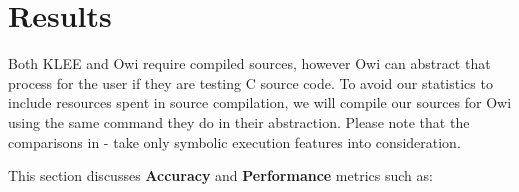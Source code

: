 

\section{Results}\label{section:results}

Both KLEE and Owi require compiled sources, however Owi can abstract that process for the user if they are testing C source code. To avoid our statistics to include resources spent in source compilation, we will compile our sources for Owi using the same command they do in their abstraction. Please note that the comparisons in  -  take only symbolic execution features into consideration.

This section discusses \textbf{Accuracy} and \textbf{Performance} metrics such as:


